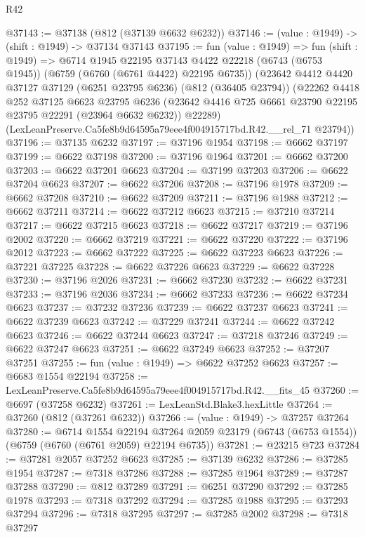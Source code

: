 \begin{lexlean}{R42}
\begin{coremodule}
{@37143 := @37138 (@812 (@37139 @6632 @6232))
@37146 := (value : @1949) -> (shift : @1949) -> @37134 @37143
@37195 := fun (value : @1949) =>
  fun (shift : @1949) =>
  @6714
    @1945
    @22195
    @37143
    @4422
    @22218
    (@6743 (@6753 @1945))
    (@6759 (@6760 (@6761 @4422) @22195 @6735))
    (@23642
      @4412
      @4420
      @37127
      @37129
      (@6251 @23795 @6236)
      (@812 (@36405 @23794))
      (@22262
        @4418
        @252
        @37125
        @6623
        @23795
        @6236
        (@23642 @4416 @725 @6661 @23790 @22195 @23795 @22291 (@23964 @6632 @6232))
        @22289)
      (LexLeanPreserve.Ca5fe8b9d64595a79eee4f004915717bd.R42.__rel_71 @23794))
@37196 := @37135 @6232
@37197 := @37196 @1954
@37198 := @6662 @37197
@37199 := @6622 @37198
@37200 := @37196 @1964
@37201 := @6662 @37200
@37203 := @6622 @37201 @6623
@37204 := @37199 @37203
@37206 := @6622 @37204 @6623
@37207 := @6622 @37206
@37208 := @37196 @1978
@37209 := @6662 @37208
@37210 := @6622 @37209
@37211 := @37196 @1988
@37212 := @6662 @37211
@37214 := @6622 @37212 @6623
@37215 := @37210 @37214
@37217 := @6622 @37215 @6623
@37218 := @6622 @37217
@37219 := @37196 @2002
@37220 := @6662 @37219
@37221 := @6622 @37220
@37222 := @37196 @2012
@37223 := @6662 @37222
@37225 := @6622 @37223 @6623
@37226 := @37221 @37225
@37228 := @6622 @37226 @6623
@37229 := @6622 @37228
@37230 := @37196 @2026
@37231 := @6662 @37230
@37232 := @6622 @37231
@37233 := @37196 @2036
@37234 := @6662 @37233
@37236 := @6622 @37234 @6623
@37237 := @37232 @37236
@37239 := @6622 @37237 @6623
@37241 := @6622 @37239 @6623
@37242 := @37229 @37241
@37244 := @6622 @37242 @6623
@37246 := @6622 @37244 @6623
@37247 := @37218 @37246
@37249 := @6622 @37247 @6623
@37251 := @6622 @37249 @6623
@37252 := @37207 @37251
@37255 := fun (value : @1949) => @6622 @37252 @6623
@37257 := @6683 @1554 @22194
@37258 := LexLeanPreserve.Ca5fe8b9d64595a79eee4f004915717bd.R42.__fits_45
@37260 := @6697 (@37258 @6232)
@37261 := LexLeanStd.Blake3.hexLittle
@37264 := @37260 (@812 (@37261 @6232))
@37266 := (value : @1949) -> @37257 @37264
@37280 := @6714
    @1554
    @22194
    @37264
    @2059
    @23179
    (@6743 (@6753 @1554))
    (@6759 (@6760 (@6761 @2059) @22194 @6735))
@37281 := @23215 @723
@37284 := @37281 @2057 @37252 @6623
@37285 := @37139 @6232
@37286 := @37285 @1954
@37287 := @7318 @37286
@37288 := @37285 @1964
@37289 := @37287 @37288
@37290 := @812 @37289
@37291 := @6251 @37290
@37292 := @37285 @1978
@37293 := @7318 @37292
@37294 := @37285 @1988
@37295 := @37293 @37294
@37296 := @7318 @37295
@37297 := @37285 @2002
@37298 := @7318 @37297
}
\end{coremodule}
\end{lexlean}
